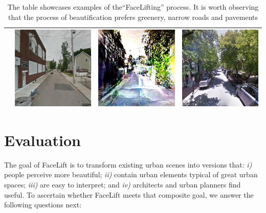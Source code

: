 \begin{table}
\begin{tabular}{l*3{C}@{}}
        & \includegraphics[width=11em]{u_8.jpeg} & \includegraphics[width=11em]{t_8.jpeg} &  \includegraphics[width=11em]{b_8.jpeg} \\ 
        \bottomrule 
    \end{tabular}
    \caption{ The table showcases examples of the``FaceLifting'' process. It is worth observing that the process of beautification prefers greenery, narrow roads and  pavements }
    \label{fig:BeautyExample}
\end{table} 



\section{Evaluation}
\label{sec:evaluation}

The goal of FaceLift is to transform existing urban scenes into versions that: \emph{i)} people perceive more beautiful; \emph{ii)} contain urban elements typical of great urban spaces; \emph{iii)} are easy to interpret; and \emph{iv)} architects and urban planners find useful. To ascertain whether FaceLift meets that composite goal, we answer the following questions next: 

